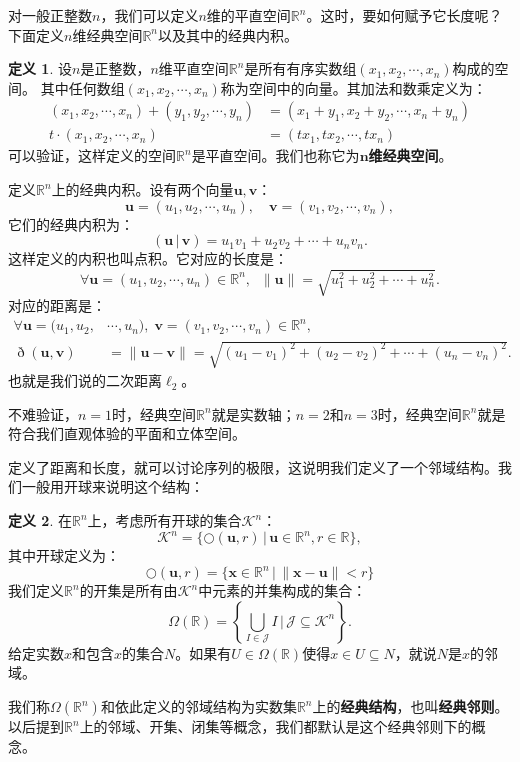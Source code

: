 \documentclass[12pt,UTF8]{ctexbook}
\newcommand{\nji}[2]{\displaystyle\left( #1 \,|\, #2\right)}
\theoremstyle{definition}
\newtheorem{df}{定义}[section]
\theoremstyle{plain}
\begin{document}
对一般正整数$n$，我们可以定义$n$维的平直空间$\mathbb{R}^n$。这时，要如何赋予它长度呢？
下面定义$n$维经典空间$\mathbb{R}^n$以及其中的经典内积。
\begin{df}
    设$n$是正整数，$n$维平直空间$\mathbb{R}^n$是所有有序实数组$(x_1, x_2, \cdots, x_n)$构成的空间。
    其中任何数组$(x_1, x_2, \cdots, x_n)$称为空间中的向量。其加法和数乘定义为：
    \begin{align*}
        (x_1, x_2, \cdots, x_n) + (y_1, y_2, \cdots, y_n) &= (x_1 + y_1, x_2 + y_2, \cdots, x_n + y_n) \\
        t\cdot (x_1, x_2, \cdots, x_n) &= (tx_1, tx_2, \cdots, t x_n)
    \end{align*}
    可以验证，这样定义的空间$\mathbb{R}^n$是平直空间。我们也称它为$\boldsymbol{n}$\textbf{维经典空间}。

    定义$\mathbb{R}^n$上的经典内积。设有两个向量$\mathbf{u}, \mathbf{v}$：
    $$ \mathbf{u} = (u_1, u_2, \cdots, u_n), \quad  \mathbf{v} = (v_1, v_2, \cdots, v_n), $$
    它们的经典内积为：
    $$ \nji{\mathbf{u}}{\mathbf{v}} = u_1v_1 + u_2v_2 + \cdots + u_n v_n.$$
    这样定义的内积也叫点积。它对应的长度是：
    $$ \forall \mathbf{u} = (u_1, u_2, \cdots, u_n) \in \mathbb{R}^n, \;\; \| \mathbf{u}\| = \sqrt{u_1^2 + u_2^2 + \cdots + u_n^2} .$$
    对应的距离是：
    \begin{align*}
        \forall \mathbf{u} = (u_1, u_2, &\cdots, u_n), \; \mathbf{v} = (v_1, v_2, \cdots, v_n) \in \mathbb{R}^n, \\
        \eth(\mathbf{u}, \mathbf{v}) &= \| \mathbf{u} - \mathbf{v}\| = \sqrt{(u_1 - v_1)^2 + (u_2 - v_2)^2 + \cdots + (u_n - v_n)^2} .
    \end{align*}
    也就是我们说的二次距离$\ell_2$。
\end{df}
不难验证，$n=1$时，经典空间$\mathbb{R}^n$就是实数轴；$n=2$和$n=3$时，经典空间$\mathbb{R}^n$就是符合我们直观体验的平面和立体空间。

定义了距离和长度，就可以讨论序列的极限，这说明我们定义了一个邻域结构。我们一般用开球来说明这个结构：
\begin{df}
    在$\mathbb{R}^n$上，考虑所有开球的集合$\mathcal{K}^n$：
    $$ \mathcal{K}^n = \{ \bigcirc(\mathbf{u}, r) \, | \, \mathbf{u} \in \mathbb{R}^n, r \in \mathbb{R} \},$$
    其中开球定义为：
    $$ \bigcirc(\mathbf{u},r) = \{ \mathbf{x}\in \mathbb{R}^n\,|\, \| \mathbf{x} - \mathbf{u}\| < r\} $$
    我们定义$\mathbb{R}^n$的开集是所有由$\mathcal{K}^n$中元素的并集构成的集合：
    $$ \Omega(\mathbb{R}) = \left\{\bigcup_{I \in \mathcal{J}} I \, \Bigg| \,\mathcal{J} \subseteq  \mathcal{K}^n \right\}.$$
    给定实数$x$和包含$x$的集合$N$。如果有$U\in\Omega(\mathbb{R})$使得$x\in U\subseteq N$，就说$N$是$x$的邻域。

    我们称$\Omega(\mathbb{R}^n)$和依此定义的邻域结构为实数集$\mathbb{R}^n$上的\textbf{经典结构}，也叫\textbf{经典邻则}。
    以后提到$\mathbb{R}^n$上的邻域、开集、闭集等概念，我们都默认是这个经典邻则下的概念。
\end{df}
\end{document}
